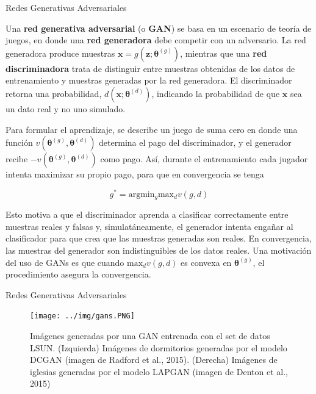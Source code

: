 \documentclass[9pt]{beamer}
\begin{document}
\begin{frame}{Redes Generativas Adversariales}

Una \textbf{red generativa adversarial} (o \textbf{GAN}) se basa en un escenario de teoría de juegos, en donde una \textbf{red generadora} debe competir con un adversario. La red generadora produce muestras $\bm{x} = g(\bm{z};\bm{\theta}^{(g)})$, mientras que una \textbf{red discriminadora} trata de distinguir entre muestras obtenidas de los datos de entrenamiento y muestras generadas por la red generadora. El discriminador retorna una probabilidad, $d(\bm{x};\bm{\theta}^{(d)})$, indicando la probabilidad de que $\bm{x}$ sea un dato real y no uno simulado. \pause
 
Para formular el aprendizaje, se describe un juego de suma cero en donde una función $v(\bm{\theta}^{(g)},\bm{\theta}^{(d)})$ determina el pago del discriminador, y el generador recibe $-v(\bm{\theta}^{(g)},\bm{\theta}^{(d)})$ como pago. Así, durante el entrenamiento cada jugador intenta maximizar su propio pago, para que en convergencia se tenga \pause

\begin{equation*}
g^{*} = \textrm{arg} \textrm{min}_{g} \textrm{max}_{d} v(g,d)
\end{equation*} \pause

Esto motiva a que el discriminador aprenda a clasificar correctamente entre muestras reales y falsas y, simulatáneamente, el generador intenta engañar al clasificador para que crea que las muestras generadas son reales. En convergencia, las muestras del generador son indistinguibles de los datos reales. Una motivación del uso de GANs es que cuando $\textrm{max}_{d} v(g,d)$ es convexa en $\bm{\theta}^{(g)}$, el procedimiento asegura la convergencia.


\end{frame}

\begin{frame}{Redes Generativas Adversariales}
\begin{figure}[H]
\captionsetup{font=small,labelfont=small}
\centering
\texttt{[image: ../img/gans.PNG]}
\caption{Imágenes generadas por una GAN entrenada con el set de datos LSUN. (Izquierda) Imágenes de dormitorios generadas por el modelo DCGAN (imagen de Radford et al., 2015). (Derecha) Imágenes de iglesias generadas por el modelo LAPGAN (imagen de Denton et al., 2015)}
\end{figure}

\end{frame}

\begin{frame}
  \titlepage
\end{frame}







\end{document}
